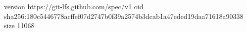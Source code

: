 version https://git-lfs.github.com/spec/v1
oid sha256:180c5446778acffef07d2747b0f39a2574b3dcab1a47eded19daa71618a90338
size 11068
